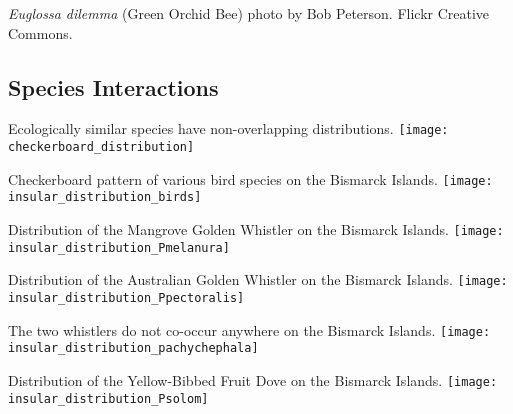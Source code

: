 \documentclass[xcolor=svgnames]{beamer}
\begin{document}
{
\begin{frame}[b,plain]
\color{LightGray}\tiny{\textit{Euglossa dilemma} (Green Orchid Bee) photo by Bob Peterson. Flickr Creative Commons.}
\end{frame}
}

\subsection{Species Interactions}

\begin{frame}{Ecologically similar species have non-overlapping distributions.}
	\centering
		\texttt{[image: checkerboard\_distribution]}\\
\end{frame}

\begin{frame}{Checkerboard pattern of various bird species on the Bismarck Islands.}
	\centering
		\texttt{[image: insular\_distribution\_birds]}\\
\end{frame}

\begin{frame}{Distribution of the Mangrove Golden Whistler on the Bismarck Islands.}
	\centering
		\texttt{[image: insular\_distribution\_Pmelanura]}\\
\end{frame}

\begin{frame}{Distribution of the Australian Golden Whistler on the Bismarck Islands.}
	\centering
		\texttt{[image: insular\_distribution\_Ppectoralis]}\\
\end{frame}

\begin{frame}{The two whistlers do not co-occur anywhere on the Bismarck Islands.}
	\centering
		\texttt{[image: insular\_distribution\_pachychephala]}\\
\end{frame}

\begin{frame}{Distribution of the Yellow-Bibbed Fruit Dove on the Bismarck Islands.}
	\centering
		\texttt{[image: insular\_distribution\_Psolom]}\\
\end{frame}
\end{document}
